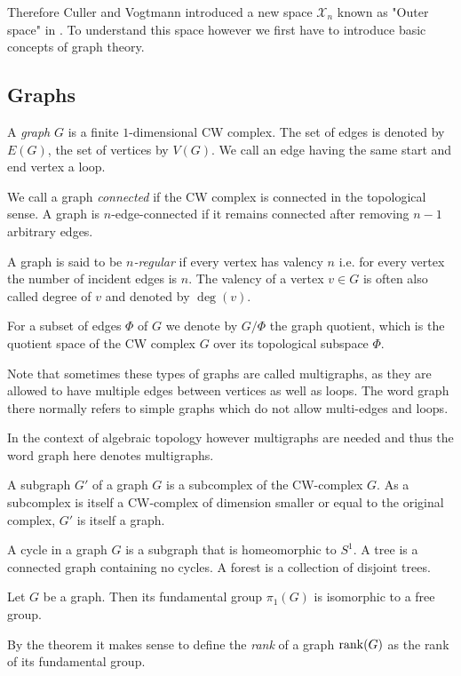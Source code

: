 Therefore Culler and Vogtmann introduced a new space $\mathcal{X}_{n}$ known as "Outer space" in \cite{vogtmann86}.
To understand this space however we first have to introduce basic concepts of graph theory.

\subsection{Graphs}
\begin{definition}
	A \emph{graph} $G$ is a finite $1$-dimensional CW complex. The set of edges is denoted by $E(G)$, the set of vertices by  $V(G)$.
	We call an edge having the same start and end vertex a loop.

	We call a graph \emph{connected} if the CW complex is connected in the topological sense.
	A graph is $n$-edge-connected if it remains connected after removing  $n-1$ arbitrary edges.

	A graph is said to be \emph{$n$-regular} if every vertex has valency $n$ i.e. for every vertex the number of incident edges is $n$.
	The valency of a vertex $v \in G$ is often also called degree of $v$ and denoted by $\deg(v)$.

	For a subset of edges $\Phi$ of $G$ we denote by $G / \Phi$ the graph quotient, which is the quotient space of the CW complex $G$ over its topological subspace $\Phi$.
\end{definition}

\begin{remark}
	Note that sometimes these types of graphs are called multigraphs, as they are allowed to have multiple edges between vertices as well as loops.
	The word graph there normally refers to simple graphs which do not allow multi-edges and loops.

	In the context of algebraic topology however multigraphs are needed and thus the word graph here denotes multigraphs.
\end{remark}

\begin{definition}
	A subgraph $G'$ of a graph $G$ is a subcomplex of the CW-complex $G$. As a subcomplex is itself a CW-complex of dimension smaller or equal to the original complex,
	 $G'$ is itself a graph.

	A cycle in a graph $G$ is a subgraph that is homeomorphic to $S^1$. A tree is a
	connected graph containing no cycles. A forest is a collection of disjoint trees.
\end{definition}

\begin{theorem}\label{thm:fg_graph}
	Let $G$ be a graph. Then its fundamental group $\pi_{1}(G)$ is isomorphic to a free group.
\end{theorem}
By the theorem it makes sense to define the \emph{rank} of a graph $\rank(G)$ as the rank of its fundamental group.

